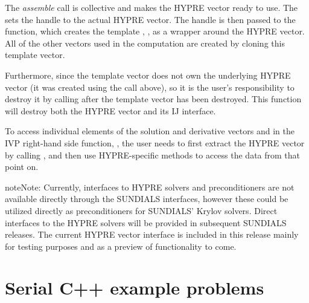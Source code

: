 \documentclass[letterpaper,10pt,english]{sphinxmanual}
\begin{document}
The \emph{assemble} call is collective and makes the HYPRE vector ready to
use.  The sets the handle  to the actual HYPRE vector.  The
handle is then passed to the  function, which creates the
template , , as a wrapper around the HYPRE vector.
All of the other vectors used in the computation are created by
cloning this template vector.

Furthermore, since the template vector does not own the underlying
HYPRE vector (it was created using the  call
above), so it is the user's responsibility to destroy it by calling
 after the template vector  has
been destroyed.  This function will destroy both the HYPRE vector
and its IJ interface.

To access individual elements of the solution and derivative vectors
 and  in the IVP right-hand side function, , the
user needs to first extract the HYPRE vector by calling
, and then use HYPRE-specific methods to access
the data from that point on.

\begin{notice}{note}{Note:}
Currently, interfaces to HYPRE solvers and preconditioners are not
available directly through the SUNDIALS interfaces, however these
could be utilized directly as preconditioners for SUNDIALS' Krylov
solvers.  Direct interfaces to the HYPRE solvers will be provided
in subsequent SUNDIALS releases.  The current HYPRE vector
interface is included in this release mainly for testing purposes
and as a preview of functionality to come.
\end{notice}


\chapter{Serial C++ example problems}
\label{cpp_serial:serial-cpp}\label{cpp_serial::doc}\label{cpp_serial:serial-c-example-problems}
\end{document}
